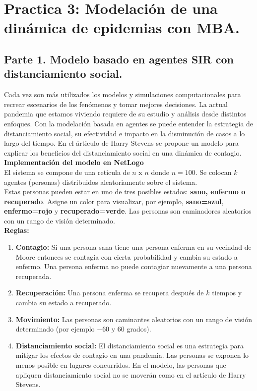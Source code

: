 \documentclass[12pt]{article}
\begin{document}

{\color{red} \section*{Practica 3: Modelación de una dinámica de epidemias
con MBA.}}
\vspace{2em}

{\color{blue} \subsection*{Parte 1. Modelo basado en agentes SIR con distanciamiento social.}}
\vspace{1em}

Cada vez son más utilizados los modelos y simulaciones computacionales para recrear escenarios de los fenómenos y tomar mejores
decisiones. La actual pandemia que estamos viviendo requiere de su estudio y análisis desde distintos enfoques. Con la modelación
basada en agentes se puede entender la estrategia de distanciamiento social, su efectividad e impacto en la disminución de casos a lo
largo del tiempo. En el árticulo de Harry Stevens se propone un modelo para explicar los beneficios del distanciamiento social en una dinámica de contagio.\\

\textbf{Implementación del modelo en NetLogo}\\

El sistema se compone de una reticula de $n$ x $n$ donde $n=100$. Se colocan $k$ agentes (personas) distribuidos aleatoriamente sobre el sistema.\\

Estas personas pueden estar en uno de tres posibles estados: \textbf{sano, enfermo o recuperado}. Asigne un color para visualizar, por ejemplo, \textbf{sano=azul}, \textbf{enfermo=rojo} y \textbf{recuperado=verde}.
Las personas son caminadores aleatorios con un rango de visión determinado.\\

\textbf{Reglas:}\\

\begin{enumerate}
    \item \textbf{Contagio:} Si una persona sana tiene una persona enferma en su vecindad de Moore entonces se contagia con cierta probabilidad y cambia su estado a enfermo. Una persona
    enferma no puede contagiar nuevamente a una persona recuperada.
    \item \textbf{Recuperación:} Una persona enferma se recupera después de $k$ tiempos y cambia su estado a recuperado.
    \item \textbf{Movimiento:} Las personas son caminantes aleatorios con un rango de visión determinado (por ejemplo $-60$ y $60$ grados).
    \item \textbf{Distanciamiento social:} El distanciamiento social es una estrategia para mitigar los efectos de contagio en una pandemia. Las personas se exponen lo menos posible en lugares concurridos. En el modelo, las personas que
    apliquen distanciamiento social no se moverán como en el artículo de Harry Stevens.
\end{enumerate}
\end{document}
